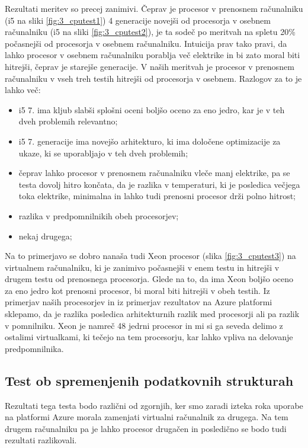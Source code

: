 Rezultati meritev so precej zanimivi. Čeprav je procesor v prenosnem računalniku (i5 na sliki \ref{fig:3_cputest1}) 4 generacije novejši od procesorja v osebnem računalniku (i5 na sliki \ref{fig:3_cputest2}), je ta sodeč po meritvah na spletu 20\% počasnejši od procesorja v osebnem računalniku. Intuicija prav tako pravi, da lahko procesor v osebnem računalniku porablja več elektrike in bi zato moral biti hitrejši, čeprav je starejše generacije. V naših meritvah je procesor v prenosnem računalniku v vseh treh testih hitrejši od procesorja v osebnem. Razlogov za to je lahko več:

\begin{itemize}
	\item i5 7. ima kljub slabši splošni oceni boljšo oceno za eno jedro, kar je v teh dveh problemih relevantno;
	\item i5 7. generacije ima novejšo arhitekturo, ki ima določene optimizacije za ukaze, ki se uporabljajo v teh dveh problemih;
	\item čeprav lahko procesor v prenosnem računalniku vleče manj elektrike, pa se testa dovolj hitro končata, da je razlika v temperaturi, ki je posledica večjega toka elektrike, minimalna in lahko tudi prenosni procesor drži polno hitrost;
	\item razlika v predpomnilnikih obeh procesorjev;
	\item nekaj drugega;
\end{itemize}

Na to primerjavo se dobro nanaša tudi Xeon procesor (slika \ref{fig:3_cputest3}) na virtualnem računalniku, ki je zanimivo počasnejši v enem testu in hitrejši v drugem testu od prenosnega procesorja. Glede na to, da ima Xeon boljšo oceno za eno jedro kot prenosni procesor, bi moral biti hitrejši v obeh testih. Iz primerjav naših procesorjev in iz primerjav rezultatov na Azure platformi sklepamo, da je razlika posledica arhitekturnih razlik med procesorji ali pa razlik v pomnilniku. Xeon je namreč 48 jedrni procesor in mi si ga seveda delimo z ostalimi virtualkami, ki tečejo na tem procesorju, kar lahko vpliva na delovanje predpomnilnika.

\subsection{Test ob spremenjenih podatkovnih strukturah}

Rezultati tega testa bodo različni od zgornjih, ker smo zaradi izteka roka uporabe na platformi Azure morala zamenjati virtualni računalnik za drugega. Na tem drugem računalniku pa je lahko procesor drugačen in posledično se bodo tudi rezultati razlikovali.

